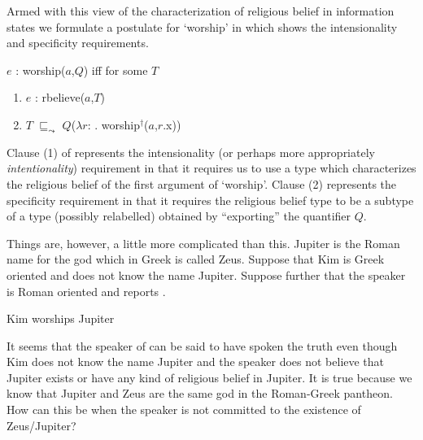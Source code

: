 Armed with this view of the characterization of religious belief in
information states we formulate a postulate for `worship' in \nexteg{}
which
shows the intensionality and specificity requirements.
\begin{ex} 
$e$ : worship($a$,$Q$) iff for some $T$
\begin{enumerate} 
 
\item $e$ : rbelieve($a$,$T$) 
 
\item $T$ $\sqsubseteq_{\leadsto}$ $Q$($\lambda
  r$: . worship$^\dagger$($a$,$r$.x))
 
\end{enumerate} 
   
\end{ex} 
Clause (1) of \preveg{} represents the intensionality (or perhaps more
appropriately \textit{intentionality}) requirement in that it requires
us to use a type which characterizes the religious belief of the
first argument of `worship'.  Clause (2) represents the specificity
requirement in that it requires the religious belief type to be a
subtype of a type (possibly relabelled) obtained by ``exporting'' the quantifier $Q$.

Things are, however, a little more complicated than this.  Jupiter is
the Roman name for the god which in Greek is called Zeus.  Suppose
that Kim is Greek oriented and does not know the name Jupiter.
Suppose further that the speaker is Roman oriented and reports
\nexteg{}.
\begin{ex} 
Kim worships Jupiter 
\end{ex} 
It seems that the speaker of \preveg{} can be said to have spoken the truth even
though Kim does not know the name Jupiter and the speaker does not
believe that Jupiter exists or have any kind of religious belief in
Jupiter.  It is true because we know that Jupiter and Zeus are the same
god in the Roman-Greek pantheon.   How can this be when the speaker is
not committed to the existence of Zeus/Jupiter?

